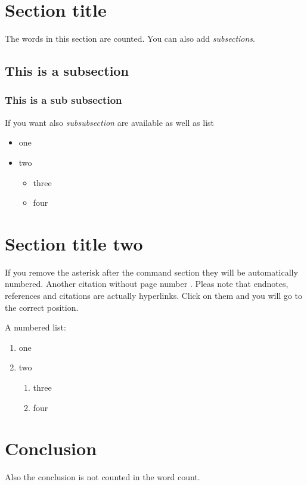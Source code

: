 \documentclass[mla8]{mla}
\begin{document}
\begin{paper}


\section*{Section title}
The words in this section are counted. You can also add \textit{subsections}.
\subsection{ This is a subsection}
\subsubsection{This is a sub subsection}
If you want also \textit{subsubsection} are available as well as list
\begin{itemize}
    \item one
    \item two
    \begin{itemize}
        \item three
        \item four
    \end{itemize}
\end{itemize}



\section*{Section title two}
If you remove the asterisk after the command section they will be automatically numbered. Another citation without page number \parencite{mishkin_eakins_2018}. Pleas note that endnotes, references and citations are actually hyperlinks. Click on them and you will go to the correct position.

A numbered list:
\begin{enumerate}
    \item one
    \item two
    \begin{enumerate}
        \item three
        \item four
    \end{enumerate}
\end{enumerate}

\section*{Conclusion}
Also the conclusion is not counted in the word count. 

\end{paper}

\begin{notes}
\printendnotes
\end{notes}

\begin{workscited}
\printbibliography[heading=none]
\end{workscited}
\end{document}
